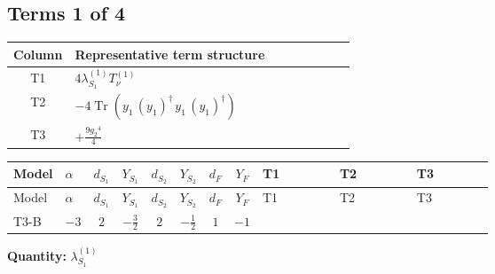 \documentclass[8pt]{article}
\begin{document}
\begin{landscape}
\subsection*{Terms 1 of 4}
\begin{center}
\begin{tabular}{@{}c >{\raggedright\arraybackslash}p{0.82\linewidth}@{}}
\toprule
Column & Representative term structure \\
\midrule
T1 & \(\displaystyle 4 {\lambda_{S_1}^{(1)}} T_{\nu}^{(1)}\) \\
\midrule
T2 & \(\displaystyle -4 \operatorname{Tr}\!\left({y_1}\,\left({y_1}\right)^{\dagger}\,{y_1}\,\left({y_1}\right)^{\dagger}\right)\) \\
\midrule
T3 & \(\displaystyle +\frac{9 {g_2}^4}{4}\) \\
\midrule
\bottomrule
\end{tabular}
\end{center}
\smallskip
\tiny
\begin{longtable}{@{}llcccccc >{\raggedright\arraybackslash}p{0.21\linewidth} >{\raggedright\arraybackslash}p{0.21\linewidth} >{\raggedright\arraybackslash}p{0.21\linewidth}@{}}
\toprule
Model & $\alpha$ & $d_{S_1}$ & $Y_{S_1}$ & $d_{S_2}$ & $Y_{S_2}$ & $d_F$ & $Y_F$ & T1 & T2 & T3 \\
\midrule
\endfirsthead
\toprule
Model & $\alpha$ & $d_{S_1}$ & $Y_{S_1}$ & $d_{S_2}$ & $Y_{S_2}$ & $d_F$ & $Y_F$ & T1 & T2 & T3 \\
\midrule
\endhead
T3-B & $-3$ & $2$ & $-\frac{3}{2}$ & $2$ & $-\frac{1}{2}$ & $1$ & $-1$ & \scriptsize\adjustbox{max width=\linewidth}{$\begin{gathered} 4 {\lambda_{S_1}^{(1)}} T_{\nu}^{(1)}\end{gathered}$} & \scriptsize\adjustbox{max width=\linewidth}{$\begin{gathered} -4 \operatorname{Tr}\!\left({y_1}\,\left({y_1}\right)^{\dagger}\,{y_1}\,\left({y_1}\right)^{\dagger}\right)\end{gathered}$} & \scriptsize\adjustbox{max width=\linewidth}{$\begin{gathered} +\frac{9 {g_2}^4}{4}\end{gathered}$} \\
\midrule
\bottomrule
\end{longtable}
\clearpage
\noindent\textbf{Quantity: }$\lambda_{S_1}^{(1)}$\par\smallskip

\end{landscape}
\end{document}

